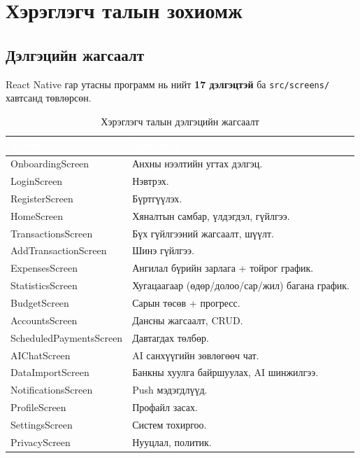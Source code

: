 \section{Хэрэглэгч талын зохиомж}

\subsection{Дэлгэцийн жагсаалт}
React Native гар утасны программ нь нийт \textbf{17 дэлгэцтэй} ба \texttt{src/screens/} хавтсанд төвлөрсөн.

\begin{table}[ht]
\centering
\footnotesize
\renewcommand{\arraystretch}{1.2}
\begin{tabular}{|p{4.5cm}|p{8cm}|}
\hline
\rowcolor{darknavy}
\textcolor{white}{\textbf{Дэлгэц}} & \textcolor{white}{\textbf{Зориулалт}} \\ \hline
OnboardingScreen      & Анхны нээлтийн угтах дэлгэц. \\ \hline
LoginScreen           & Нэвтрэх. \\ \hline
RegisterScreen        & Бүртгүүлэх. \\ \hline
HomeScreen            & Хяналтын самбар, үлдэгдэл, гүйлгээ. \\ \hline
TransactionsScreen    & Бүх гүйлгээний жагсаалт, шүүлт. \\ \hline
AddTransactionScreen  & Шинэ гүйлгээ. \\ \hline
ExpensesScreen        & Ангилал бүрийн зарлага + тойрог график. \\ \hline
StatisticsScreen      & Хугацаагаар (өдөр/долоо/сар/жил) багана график. \\ \hline
BudgetScreen          & Сарын төсөв + прогресс. \\ \hline
AccountsScreen        & Дансны жагсаалт, CRUD. \\ \hline
ScheduledPaymentsScreen & Давтагдах төлбөр. \\ \hline
AIChatScreen          & AI санхүүгийн зөвлөгөөч чат. \\ \hline
DataImportScreen      & Банкны хуулга байршуулах, AI шинжилгээ. \\ \hline
NotificationsScreen   & Push мэдэгдлүүд. \\ \hline
ProfileScreen         & Профайл засах. \\ \hline
SettingsScreen        & Систем тохиргоо. \\ \hline
PrivacyScreen         & Нууцлал, политик. \\ \hline
\end{tabular}
\caption{Хэрэглэгч талын дэлгэцийн жагсаалт}
\label{tab:screens}
\end{table}

